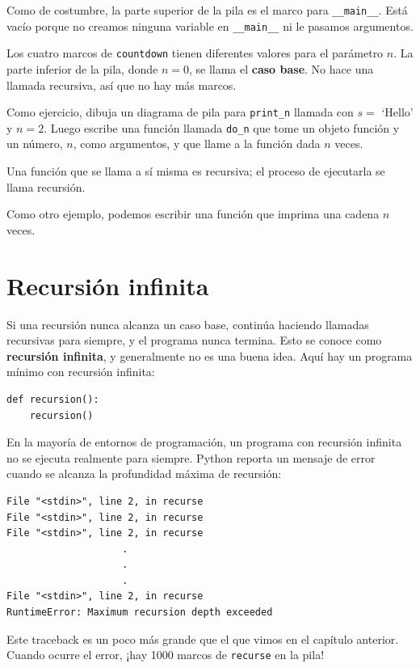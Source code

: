 Como de costumbre, la parte superior de la pila es el marco para \texttt{\_\_main\_\_}. Está vacío porque no creamos ninguna variable en \texttt{\_\_main\_\_} ni le pasamos argumentos.

Los cuatro marcos de \texttt{countdown} tienen diferentes valores para el parámetro $n$. La parte inferior de la pila, donde $n=0$, se llama el \textbf{caso base}. No hace una llamada recursiva, así que no hay más marcos.

Como ejercicio, dibuja un diagrama de pila para \texttt{print\_n} llamada con $s = $ `Hello' y $n=2$. Luego escribe una función llamada \texttt{do\_n} que tome un objeto función y un número, $n$, como argumentos, y que llame a la función dada $n$ veces.

Una función que se llama a sí misma es recursiva; el proceso de ejecutarla se llama recursión.

Como otro ejemplo, podemos escribir una función que imprima una cadena $n$ veces.

\section{Recursión infinita}

Si una recursión nunca alcanza un caso base, continúa haciendo llamadas recursivas para siempre, y el programa nunca termina. Esto se conoce como \textbf{recursión infinita}, y generalmente no es una buena idea. Aquí hay un programa mínimo con recursión infinita:

\begin{lstlisting}
def recursion():
    recursion()
\end{lstlisting}

En la mayoría de entornos de programación, un programa con recursión infinita no se ejecuta realmente para siempre. Python reporta un mensaje de error cuando se alcanza la profundidad máxima de recursión:

\begin{lstlisting}
File "<stdin>", line 2, in recurse
File "<stdin>", line 2, in recurse
File "<stdin>", line 2, in recurse
                    .
                    .
                    .
File "<stdin>", line 2, in recurse
RuntimeError: Maximum recursion depth exceeded
\end{lstlisting}

Este traceback es un poco más grande que el que vimos en el capítulo anterior. Cuando ocurre el error, ¡hay 1000 marcos de \texttt{recurse} en la pila!

